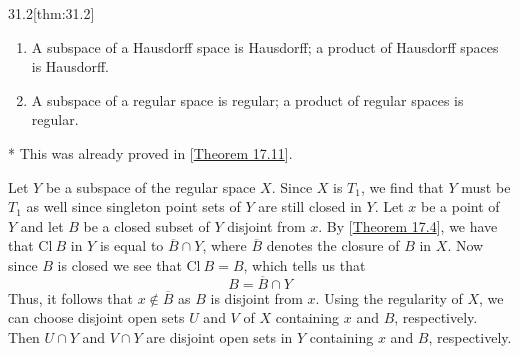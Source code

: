 \begin{thmBox}{31.2}[thm:31.2]
    \begin{enumerate}[label = (\alph*)]
        \item A subspace of a Hausdorff space is Hausdorff; a product of 
            Hausdorff spaces is Hausdorff.
        \item A subspace of a regular space is regular; a product of regular
            spaces is regular.
    \end{enumerate}

    \baseRule

    \begin{proofBox}*
        This was already proved in [\hyperlink{thm:17.11}{Theorem 17.11}].

        \baseSkip

        Let \( Y \) be a subspace of the regular space \( X \).
        Since \( X \) is \( T_{ 1 } \), we find that \( Y \) must be \( T_{ 1 } \)
        as well since singleton point sets of \( Y \) are still closed in \( Y \).
        Let \( x \) be a point of \( Y \) and let \( B \) be a closed subset of \( Y \) 
        disjoint from \( x \). 
        By [\hyperlink{thm:17.4}{Theorem 17.4}], we have that \( \mathrm{Cl} \ B \) in
        \( Y \) is equal to \( \overline{ B } \cap Y \), where \( \overline{ B } \)
        denotes the closure of \( B \) in \( X \).
        Now since \( B \) is closed we see that \( \mathrm{Cl} \ B = B \), which tells 
        us that 
        \begin{equation*}
            B = \overline{ B } \cap Y
        \end{equation*}
        Thus, it follows that \( x \notin \overline{ B } \) as \( B \) is disjoint from
        \( x \).
        Using the regularity of \( X \), we can choose disjoint open sets \( U \) and 
        \( V \) of \( X \) containing \( x \) and \( B \), respectively.
        Then \( U \cap Y \) and \( V \cap Y \) are disjoint open sets in \( Y \)
        containing \( x \) and \( B \), respectively.

        \baseSkip


\end{proofBox}
\end{thmBox}
